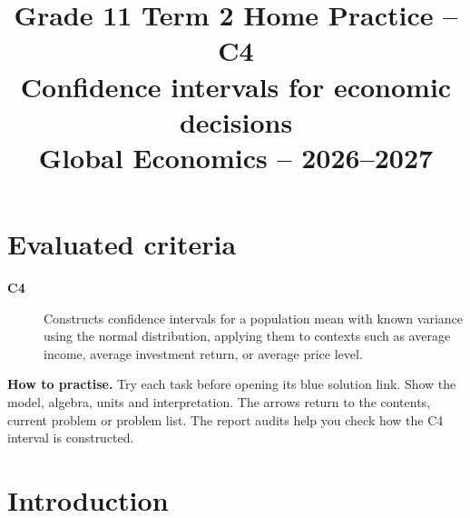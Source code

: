 \makeatletter
{}
\makeatother



\CoordinatedTermTwoPalette
\usepackage{needspace}
\usepackage{titling}
\setlength{\droptitle}{-2em}
\pretitle{\par\begingroup\centering\LARGE}
\posttitle{\par\endgroup}
\preauthor{}\postauthor{}
\predate{}\postdate{}
\maketitlehookd{\vspace{-1em}}
\linespread{1.12}
\setlength{\parskip}{5pt}
\newcommand{\ExampleOne}{\textbullet\ \hyperref[ex:intro-one]{Example 1}: }
\newcommand{\ExampleTwo}{\textbullet\ \hyperref[ex:intro-two]{Example 2}: }
\title{Grade 11 Term 2 Home Practice -- C4\\\large Confidence intervals for economic decisions\\[0.25em]
\normalsize Global Economics -- 2026--2027}
\author{}
\date{}

\maketitle
\setcounter{tocdepth}{1}
\setcounter{secnumdepth}{2}
\label{toc}
\tableofcontents
\section*{Evaluated criteria}

\begin{description}
\item[\textbf{C4}] Constructs confidence intervals for a population mean with known variance using the normal distribution, applying them to contexts such as average income, average investment return, or average price level.
\end{description}
\textbf{How to practise.} Try each task before opening its blue solution link. Show the model, algebra, units and interpretation. The arrows return to the contents, current problem or problem list. The report audits help you check how the C4 interval is constructed.

\clearpage
\section{Introduction}\label{sec:introduction}
